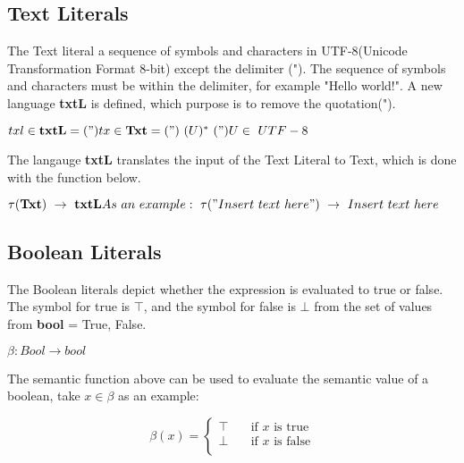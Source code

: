   
  \subsection{Text Literals}
  The Text literal a sequence of symbols and characters in UTF-8(Unicode Transformation Format 8-bit) except the delimiter ("). The sequence of symbols and characters must be within the delimiter, for example "Hello world!". A new language \textbf{txtL} is defined, which purpose is to remove the quotation("). 
  
  \begin{math}
  txl \in \textbf{txtL} = (") \newline
  tx \in \textbf{Txt} = (") \ (U)^* \ (")\ \newline
  U \in \ {UTF-8}
  \end{math}
  
  The langauge \textbf{txtL} translates the input of the Text Literal to Text, which is done with the function below. 
  
  \begin{math}
  	\tau(\textbf{Txt}) \ \rightarrow \ \textbf{txtL} \newline
  	As \ an \ example: \ \tau("Insert \ text \ here") \ \rightarrow \ Insert \ text \ here
  \end{math}
  
  
  
  
  \subsection{Boolean Literals}
  The Boolean literals depict whether the expression is evaluated to true or false. The symbol for true is \begin{math} \top \end{math}, and the symbol for false is \begin{math} \bot \end{math} from the set of values from \textbf{bool} = {True, False}.
  
  \begin{math}
  	\beta : Bool \rightarrow bool
  \end{math}
  
  The semantic function above can be used to evaluate the semantic value of a boolean, take \begin{math} x \in \beta  \end{math} as an example:
  
  \[ \beta(x) =
    \begin{cases}
      \top       & \quad \text{if } x \text{ is true}\\
      \bot  & \quad \text{if } x \text{ is false}\\
    \end{cases}
  \]
  
